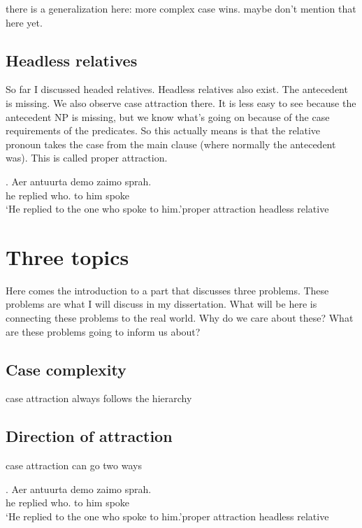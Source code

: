 there is a generalization here: more complex case wins. maybe don't mention that here yet.


\subsection{Headless relatives}

So far I discussed headed relatives. Headless relatives also exist. The antecedent is missing. We also observe case attraction there. It is less easy to see because the antecedent NP is missing, but we know what's going on because of the case requirements of the predicates. So this actually means is that the relative pronoun takes the case from the main clause (where normally the antecedent was). This is called proper attraction.

\exg. Aer antuurta demo zaimo sprah.\\
he replied who. {to him} spoke\\
`He replied to the one who spoke to him.'\hfill proper attraction headless relative



\section{Three topics}

Here comes the introduction to a part that discusses three problems. These problems are what I will discuss in my dissertation. What will be here is connecting these problems to the real world. Why do we care about these? What are these problems going to inform us about?

\subsection{Case complexity}

case attraction always follows the hierarchy



\subsection{Direction of attraction}

case attraction can go two ways

\exg. Aer antuurta demo zaimo sprah.\\
he replied who. {to him} spoke\\
`He replied to the one who spoke to him.'\hfill proper attraction headless relative

